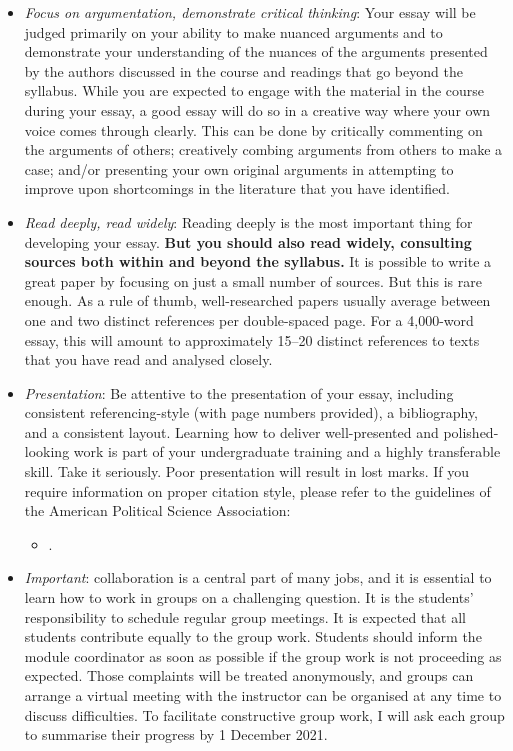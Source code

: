 \documentclass[abstract=on,parskip=full,headings=standardclasses,fontsize=11pt,paper=a4]{scrartcl}
\begin{document}
\begin{itemize}
\begin{itemize}
\item \textit{Focus on argumentation, demonstrate critical thinking}: Your essay will be judged primarily on your ability to make nuanced arguments and to demonstrate your understanding of the nuances of the arguments presented by the authors discussed in the course and readings that go beyond the syllabus. While you are expected to engage with the material in the course during your essay, a good essay will do so in a creative way where your own voice comes through clearly. This can be done by critically commenting on the arguments of others; creatively combing arguments from others to make a case; and/or presenting your own original arguments in attempting to improve upon shortcomings in the literature that you have identified.
\item \textit{Read deeply, read widely}: Reading deeply is the most important thing for developing your essay. \textbf{But you should also read widely, consulting sources both within and beyond the syllabus.} It is possible to write a great paper by focusing on just a small number of sources. But this is rare enough. As a rule of thumb, well-researched papers usually average between one and two distinct references per double-spaced page. For a 4,000-word essay, this will amount to approximately 15--20 distinct references to texts that you have read and analysed closely. 
\item \textit{Presentation}: Be attentive to the presentation of your essay, including consistent referencing-style (with page numbers provided), a bibliography, and  a consistent layout. Learning how to deliver well-presented and polished-looking work is part of your undergraduate training and a highly transferable skill. Take it seriously. Poor presentation will result in lost marks. If you require information on proper citation style, please refer to the guidelines of the American Political Science Association: 
\begin{itemize}
\item {}.
\end{itemize}
\item 
\textit{Important}: collaboration is a central part of many jobs, and it is essential to learn how to work in groups on a challenging question. It is the students' responsibility to schedule regular group meetings. It is expected that all students contribute equally to the group work. Students should inform the module coordinator as soon as possible if the group work is not proceeding as expected. Those complaints will be treated anonymously, and groups can arrange a virtual meeting with the instructor can be organised at any time to discuss difficulties. To facilitate constructive group work, I will ask each group to summarise their progress by 1 December 2021.
\end{itemize}
\end{itemize}
\end{document}
